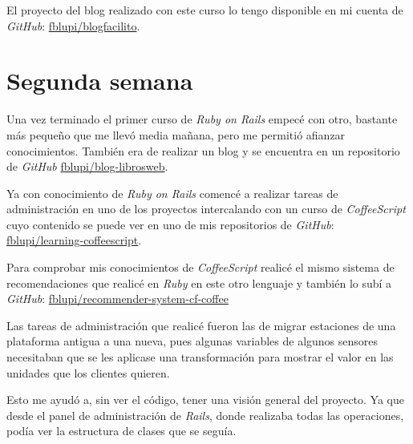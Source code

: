 El proyecto del blog realizado con este curso lo tengo disponible en mi cuenta de \textit{GitHub}: \href{https://github.com/fblupi/blogfacilito}{fblupi/blogfacilito}.

\section{Segunda semana}

Una vez terminado el primer curso de \textit{Ruby on Rails} empecé con otro, bastante más pequeño que me llevó media mañana, pero me permitió afianzar conocimientos. También era de realizar un blog y se encuentra en un repositorio de \textit{GitHub} \href{https://github.com/fblupi/blog-librosweb}{fblupi/blog-librosweb}.

Ya con conocimiento de \textit{Ruby on Rails} comencé a realizar tareas de administración en uno de los proyectos intercalando con un curso de \textit{CoffeeScript} cuyo contenido se puede ver en uno de mis repositorios de \textit{GitHub}: \href{https://github.com/fblupi/learning-coffeescript}{fblupi/learning-coffeescript}.

Para comprobar mis conocimientos de \textit{CoffeeScript} realicé el mismo sistema de recomendaciones que realicé en \textit{Ruby} en este otro lenguaje y también lo subí a \textit{GitHub}: \href{https://github.com/fblupi/recommender-system-cf-coffee}{fblupi/recommender-system-cf-coffee}

Las tareas de administración que realicé fueron las de migrar estaciones de una plataforma antigua a una nueva, pues algunas variables de algunos sensores necesitaban que se les aplicase una transformación para mostrar el valor en las unidades que los clientes quieren.

Esto me ayudó a, sin ver el código, tener una visión general del proyecto. Ya que desde el panel de administración de \textit{Rails}, donde realizaba todas las operaciones, podía ver la estructura de clases que se seguía.